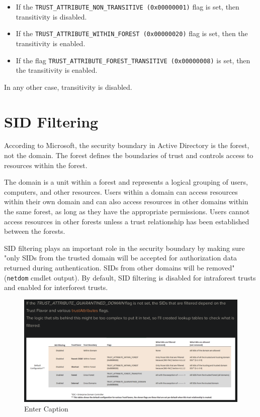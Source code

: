 \importantbox
\begin{itemize}
    \item If the \verb|TRUST_ATTRIBUTE_NON_TRANSITIVE (0x00000001)| flag is set, then transitivity is disabled.
    \item If the \verb|TRUST_ATTRIBUTE_WITHIN_FOREST (0x00000020)| flag is set, then the transitivity is enabled.
    \item If the flag \verb|TRUST_ATTRIBUTE_FOREST_TRANSITIVE (0x00000008)| is set, then the transitivity is enabled.

\end{itemize}
In any other case, transitivity is disabled.

\section{SID Filtering}
According to Microsoft, the security boundary in Active Directory is the forest, not the domain. The forest defines the boundaries of trust and controls access to resources within the forest.

The domain is a unit within a forest and represents a logical grouping of users, computers, and other resources. Users within a domain can access resources within their own domain and can also access resources in other domains within the same forest, as long as they have the appropriate permissions. Users cannot access resources in other forests unless a trust relationship has been established between the forests.

SID filtering plays an important role in the security boundary by making sure "only SIDs from the trusted domain will be accepted for authorization data returned during authentication. SIDs from other domains will be removed" (\verb|netdom| cmdlet output). By default, SID filtering is disabled for intraforest trusts and enabled for interforest trusts.

 \begin{figure}
     \centering
     \includegraphics[width=0.75\linewidth]{defaultconfig1.png}
     \caption{Enter Caption}
     \label{fig:placeholder}
 \end{figure}

